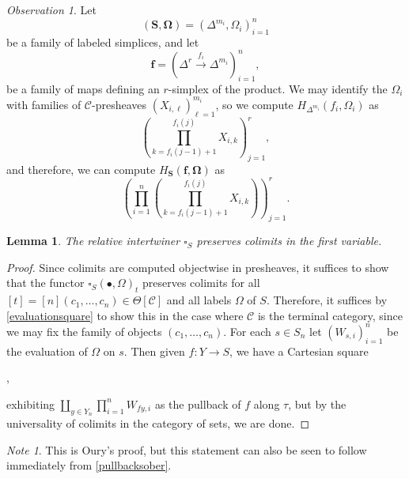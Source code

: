 \documentclass[leqno]{article}
\numberwithin{equation}{subsection}
\theoremstyle{plain}   %
\newtheorem{lemma}[equation]{Lemma}
\theoremstyle{remark}
\newtheorem{note}[equation]{Note}
\newtheorem{obs}[equation]{Observation}
\theoremstyle{plain}
\providecommand{\C}{}
\renewcommand{\C}{\ensuremath{\mathcal{C}}}
\begin{document}
\begin{obs}
	Let \[(\mathbf{S},\mathbf{\Omega})=\left(\Delta^{m_i},\Omega_i\right)_{i=1}^n\] be a family of labeled simplices, and let \[\mathbf{f}=\left(\Delta^r\xrightarrow{f_i} \Delta^{m_i}\right)^n_{i=1},\] be a family of maps defining an \(r\)-simplex of the product.
	We may identify the \(\Omega_i\) with families of \(\C\)-presheaves \((X_{i,\ell})^{m_i}_{\ell=1}\), so we compute \(H_{\Delta^{m_i}}(f_i,\Omega_i)\) as 
	\[ \left(\prod_{k=f_i(j-1)+1}^{f_i(j)} X_{i,k} \right)_{j=1}^r,\]
	and therefore, we can compute 
	\(H_{\mathbf{S}}(\mathbf{f},\mathbf{\Omega})\) as 
	\[ \left(\prod_{i=1}^n \left(\prod_{k=f_i(j-1)+1}^{f_i(j)} X_{i,k} \right)\right)_{j=1}^r.\]
\end{obs}
\begin{lemma}
	The relative intertwiner \(\square_S\) preserves colimits in the first variable.
\end{lemma}
\begin{proof} 
	Since colimits are computed objectwise in presheaves, it suffices to show that the functor \(\square_S(\bullet,\Omega)_t\) preserves colimits for all \([t]=[n](c_1,\dots,c_n) \in \Theta[\C]\) and all labels \(\Omega\) of \(S\).  Therefore, it suffices by \ref{evaluationsquare} to show this in the case where \(\C\) is the terminal category, since we may fix the family of objects \((c_1,\dots,c_n)\). For each \(s\in S_n\) let \((W_{s,i})_{i=1}^n\) be the evaluation of \(\Omega\) on \(s\).  Then given \(f:Y\to S\), we have a Cartesian square
	\begin{center}
		,
	\end{center}
	exhibiting \(\coprod_{y\in Y_n} \prod_{i=1}^n W_{fy,i}\) as the pullback of \(f\) along \(\tau\), but by the universality of colimits in the category of sets, we are done.  
\end{proof}

\begin{note} 
	This is Oury's proof, but this statement can also be seen to follow immediately from \ref{pullbacksober}.
\end{note}
\end{document}
